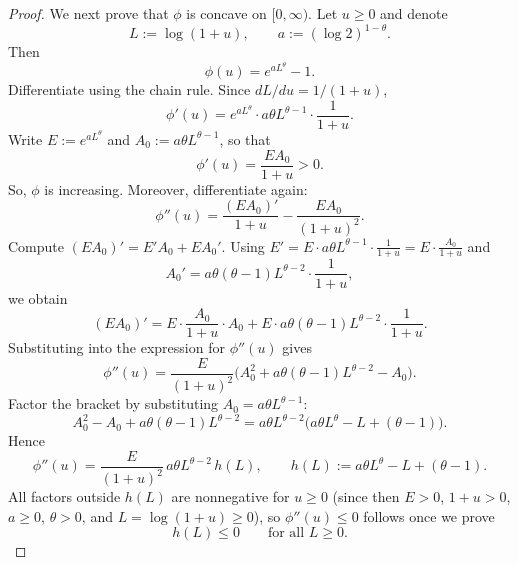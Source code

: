 \documentclass[12pt]{article}
\renewcommand{\(}{\left(}%
\renewcommand{\)}{\right)}%
\renewcommand{\[}{\left[}%
\renewcommand{\]}{\right]}%
\newtheorem{proof}{Proof.}}
\begin{document}
\begin{proof}
We next prove that $\phi$ is concave on $[0,\infty)$. Let $u\ge 0$ and denote
\begin{equation*}
L:=\log(1+u),
\qquad
a:=(\log 2)^{1-\theta}.
\end{equation*}
Then
\begin{equation*}
\phi(u)=e^{aL^\theta}-1.
\end{equation*}
Differentiate using the chain rule. Since $dL/du=1/(1+u)$,
\begin{equation*}
\phi'(u)
=e^{aL^\theta}\cdot a\theta L^{\theta-1}\cdot \frac{1}{1+u}.
\end{equation*}
Write $E:=e^{aL^\theta}$ and $A_0:=a\theta L^{\theta-1}$, so that
\begin{equation*}
\phi'(u)=\frac{EA_0}{1+u}>0.
\end{equation*}
So, $\phi$ is increasing. Moreover, differentiate again:
\begin{equation*}
\phi''(u)=\frac{(EA_0)'}{1+u}-\frac{EA_0}{(1+u)^2}.
\end{equation*}
Compute $(EA_0)'=E'A_0+EA_0'$. Using $E'=E\cdot a\theta L^{\theta-1}\cdot \frac{1}{1+u}=E\cdot \frac{A_0}{1+u}$ and
\begin{equation*}
A_0' = a\theta(\theta-1)L^{\theta-2}\cdot \frac{1}{1+u},
\end{equation*}
we obtain
\begin{equation*}
(EA_0)'=E\cdot \frac{A_0}{1+u}\cdot A_0 + E\cdot a\theta(\theta-1)L^{\theta-2}\cdot \frac{1}{1+u}.
\end{equation*}
Substituting into the expression for $\phi''(u)$ gives
\begin{equation*}
\phi''(u)
=\frac{E}{(1+u)^2}\Big(A_0^2 + a\theta(\theta-1)L^{\theta-2} - A_0\Big).
\end{equation*}
Factor the bracket by substituting $A_0=a\theta L^{\theta-1}$:
\begin{equation*}
A_0^2 - A_0 + a\theta(\theta-1)L^{\theta-2}
=a\theta L^{\theta-2}\Big(a\theta L^\theta - L + (\theta-1)\Big).
\end{equation*}
Hence
\begin{equation*}
\phi''(u)
=
\frac{E}{(1+u)^2}\,a\theta L^{\theta-2}\,h(L),
\qquad
h(L):=a\theta L^\theta - L + (\theta-1).
\end{equation*}
All factors outside $h(L)$ are nonnegative for $u\ge 0$ (since then $E>0$, $1+u>0$, $a\ge 0$, $\theta>0$, and $L=\log(1+u)\ge 0$), so $\phi''(u)\le 0$ follows once we prove
\begin{equation*}
h(L)\le 0
\qquad\text{for all }L\ge 0.
\end{equation*}


\end{proof}
\end{document}
